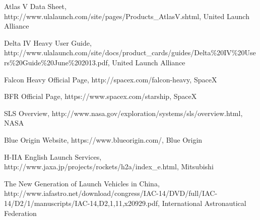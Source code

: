 \documentclass{article}
\begin{document}
\begin{thebibliography}{9}

    Atlas V Data Sheet,
    http://www.ulalaunch.com/site/pages/Products\_AtlasV.shtml,
    United Launch Alliance

    Delta IV Heavy User Guide, \\
    http://www.ulalaunch.com/site/docs/product\_cards/guides/Delta\%20IV\%20Users\%20Guide\%20June\%202013.pdf,
    United Launch Alliance

    Falcon Heavy Official Page,
    http://spacex.com/falcon-heavy,
    SpaceX

    BFR Official Page,
    https://www.spacex.com/starship,
    SpaceX

    SLS Overview,
    http://www.nasa.gov/exploration/systems/sls/overview.html,
    NASA

    Blue Origin Website,
    https://www.blueorigin.com/,
    Blue Origin 

    H-IIA English Launch Services,
    http://www.jaxa.jp/projects/rockets/h2a/index\_e.html,
    Mitsubishi

    The New Generation of Launch Vehicles in China,
    http://www.iafastro.net/download/congress/IAC-14/DVD/full/IAC-14/D2/1/manuscripts/IAC-14,D2,1,11,x20929.pdf,
    International Astronautical Federation

\end{thebibliography}
\end{document}
